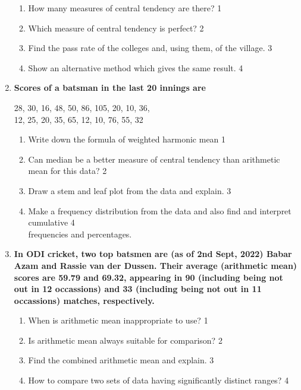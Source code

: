 \documentclass[a4paper,oneside]{book}
\begin{document}
\begin{enumerate}
  \begin{enumerate}
    \item
	How many measures of central tendency are there? \hfill 1
    \item
	Which measure of central tendency is perfect? \hfill 2
    \item  
	Find the pass rate of the colleges and, using them, of the village. \hfill 3
    \item
	Show an alternative method which gives the same result. \hfill 4
  \end{enumerate}

      \item
  \textbf{Scores of a batsman in the last 20 innings are} 
   \begin{center}
  	 28, 30, 16, 48, 50, 86, 105, 20, 10, 36, \\
  	 12, 25, 20, 35, 65, 12, 10, 76, 55, 32
  	 \end{center}
  \begin{enumerate}
    \item
	Write down the formula of weighted harmonic mean \hfill 1
    \item
	Can median be a better measure of central tendency than arithmetic mean for this data?  \hfill 2
    \item  
	Draw a stem and leaf plot from the data and explain.  \hfill 3
    \item
	Make a frequency distribution from the data and also find and interpret cumulative  \hfill 4 \\ frequencies and percentages.
\end{enumerate}

 \item
	  \textbf{In ODI cricket, two top batsmen are (as of 2nd Sept, 2022) Babar Azam and Rassie van der Dussen. Their average (arithmetic mean) scores are 59.79 and 69.32, appearing in 90 (including being not out in 12 occassions) and 33 (including being not out in 11 occassions) matches, respectively.} 
  
  \begin{enumerate}
    \item
	When is arithmetic mean inappropriate to use? \hfill 1
    \item
	Is arithmetic mean always suitable for comparison? \hfill 2
    \item  
	Find the combined arithmetic mean and explain. \hfill 3
    \item
	How to compare two sets of data having significantly distinct ranges? \hfill 4
  \end{enumerate}
  

\end{enumerate}
\end{document}
